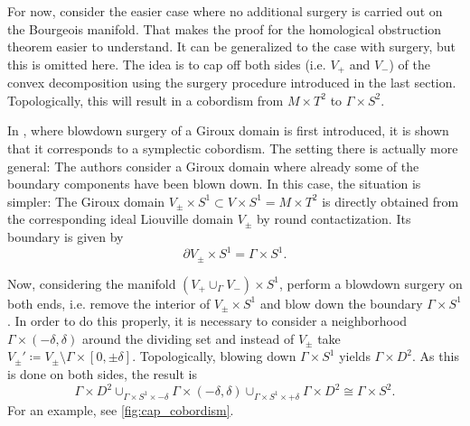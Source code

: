 For now, consider the easier case where no additional surgery is carried out on the Bourgeois manifold.
That makes the proof for the homological obstruction theorem easier to understand.
It can be generalized to the case with surgery, but this is omitted here.
The idea is to cap off both sides (i.e. $V_+$ and $V_-$) of the convex decomposition
using the surgery procedure introduced in the last section.
Topologically, this will result in a cobordism from $M\times T^2$ to $\Gamma \times S^2$.

In \cite[Section 6]{MNW13}, where blowdown surgery of a Giroux domain is first introduced,
it is shown that it corresponds to a symplectic cobordism.
The setting there is actually more general: The authors consider a Giroux
domain where already some of the boundary components have been blown down.
In this case, the situation is simpler: The Giroux domain 
$V_\pm \times S^1 \subset V \times S^1 = M \times T^2$
is directly obtained from the corresponding ideal Liouville domain $V_\pm$ by 
round contactization.
Its boundary is given by 
\[
    \partial V_\pm \times S^1 = \Gamma \times S^1.
\]

Now, considering the manifold $(V_+ \cup_\Gamma V_-)\times S^1$, perform a blowdown
surgery on both ends, i.e. remove the interior of $V_\pm \times S^1$ and blow down the boundary $\Gamma \times S^1$.
In order to do this properly, it is necessary to consider a neighborhood 
$\Gamma \times (-\delta, \delta)$ around the dividing set and 
instead of $V_\pm$ take $V_\pm' \coloneqq V_\pm \setminus \Gamma \times [0, \pm \delta]$.
Topologically, blowing down $\Gamma \times S^1$ yields $\Gamma \times D^2$.
As this is done on both sides, the result is 
\[
    \Gamma \times D^2 \cup_{\Gamma \times S^1 \times -\delta} \Gamma \times (-\delta,\delta) 
    \cup_{\Gamma \times S^1 \times +\delta} \Gamma \times D^2 \cong \Gamma \times S^2.
\]
For an example, see \cref{fig:cap_cobordism}.

